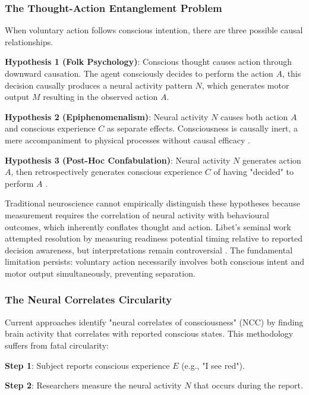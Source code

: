 \documentclass[11pt,onecolumn]{article}
\begin{document}
\subsubsection{The Thought-Action Entanglement Problem}

When voluntary action follows conscious intention, there are three possible causal relationships.

\textbf{Hypothesis 1 (Folk Psychology)}: Conscious thought causes action through downward causation. The agent consciously decides to perform the action $A$, this decision causally produces a neural activity pattern $N$, which generates motor output $M$ resulting in the observed action $A$.

\textbf{Hypothesis 2 (Epiphenomenalism)}: Neural activity $N$ causes both action $A$ and conscious experience $C$ as separate effects. Consciousness is causally inert, a mere accompaniment to physical processes without causal efficacy \citep{huxley1874hypothesis}.

\textbf{Hypothesis 3 (Post-Hoc Confabulation)}: Neural activity $N$ generates action $A$, then retrospectively generates conscious experience $C$ of having "decided" to perform $A$ \citep{wegner2002illusion}.

Traditional neuroscience cannot empirically distinguish these hypotheses because measurement requires the correlation of neural activity with behavioural outcomes, which inherently conflates thought and action. Libet's seminal work \citep{libet1983time} attempted resolution by measuring readiness potential timing relative to reported decision awareness, but interpretations remain controversial \citep{schurger2012accumulator,maoz2019neural}. The fundamental limitation persists: voluntary action necessarily involves both conscious intent and motor output simultaneously, preventing separation.

\subsubsection{The Neural Correlates Circularity}

Current approaches identify "neural correlates of consciousness" (NCC) \citep{crick1990towards,koch2016neural} by finding brain activity that correlates with reported conscious states. This methodology suffers from fatal circularity:

\textbf{Step 1}: Subject reports conscious experience $E$ (e.g., "I see red").

\textbf{Step 2}: Researchers measure the neural activity $N$ that occurs during the report.
\end{document}
